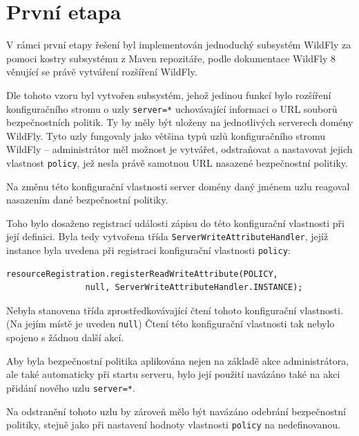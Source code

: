 \section{První etapa}

V rámci první etapy řešení byl implementován jednoduchý subsystém WildFly za pomoci kostry subsystému z Maven repozitáře, podle dokumentace WildFly 8 věnující se právě vytváření rozšíření WildFly. \cite{WildFlyExtending}

Dle tohoto vzoru byl vytvořen subsystém, jehož jedinou funkcí bylo rozšíření konfiguračního stromu o uzly {\tt server=*} uchovávající informaci o URL souborů bezpečnostních politik.
Ty by měly být uloženy na jednotlivých serverech domény WildFly.
Tyto uzly fungovaly jako většina typů uzlů konfiguračního stromu WildFly -- administrátor měl možnost je vytvářet, odstraňovat a nastavovat jejich vlastnost {\tt policy}, jež nesla právě samotnou URL nasazené bezpečnostní politiky.

Na změnu této konfigurační vlastnosti server domény daný jménem uzlu reagoval nasazením dané bezpečnostní politiky.

Toho bylo dosaženo registrací události zápisu do této konfigurační vlastnosti při její definici.
Byla tedy vytvořena třída {\tt ServerWriteAttributeHandler}, jejíž instance byla uvedena při registraci konfigurační vlastnosti {\tt policy}:

\begin{lstlisting}[caption=Registrace konfigurační vlastnosti {\tt policy} uzlu {\tt server=*}, label=registraceAtributu]
resourceRegistration.registerReadWriteAttribute(POLICY,
                null, ServerWriteAttributeHandler.INSTANCE);
\end{lstlisting}

Nebyla stanovena třída zprostředkovávající čtení tohoto konfigurační vlastnosti. (Na jejím místě je uveden {\tt null}) Čtení této konfigurační vlastnosti tak nebylo spojeno s žádnou další akcí.

Aby byla bezpečnostní politika aplikována nejen na základě akce administrátora, ale také automaticky při startu serveru, bylo její použití navázáno také na akci přidání nového uzlu {\tt server=*}.

Na odstranění tohoto uzlu by zároveň mělo být navázáno odebrání bezpečnostní politiky, stejně jako při nastavení hodnoty vlastnosti {\tt policy} na nedefinovanou.

